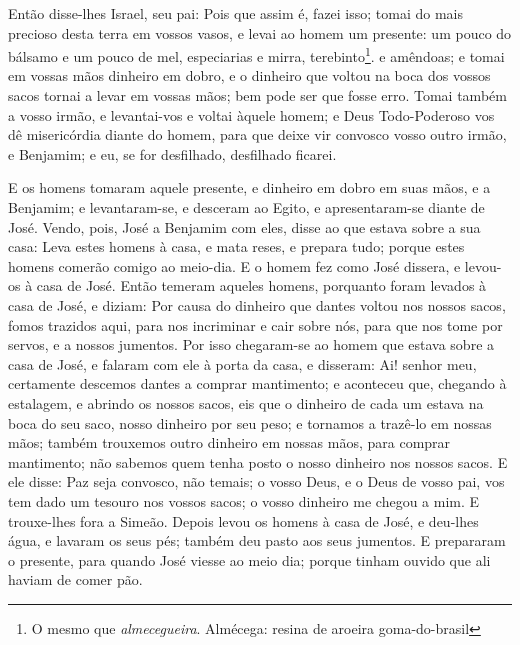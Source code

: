Então disse-lhes Israel, seu pai: Pois que assim é, fazei isso;
tomai do mais precioso desta terra em vossos vasos, e levai ao homem
um presente: um pouco do bálsamo e um pouco de mel, especiarias e
mirra, terebinto\footnote{O mesmo que \emph{almecegueira}. Almécega:
resina de aroeira goma-do-brasil}. e amêndoas; e tomai em
vossas mãos dinheiro em dobro, e o dinheiro que voltou na boca dos
vossos sacos tornai a levar em vossas mãos; bem pode ser que fosse
erro. Tomai também a vosso irmão, e levantai-vos e voltai
àquele homem; e Deus Todo-Poderoso vos dê misericórdia diante
do homem, para que deixe vir convosco vosso outro irmão, e Benjamim;
e eu, se for desfilhado, desfilhado ficarei.

E os homens tomaram aquele presente, e dinheiro em dobro em suas
mãos, e a Benjamim; e levantaram-se, e desceram ao Egito, e
apresentaram-se diante de José. Vendo, pois, José a Benjamim
com eles, disse ao que estava sobre a sua casa: Leva estes homens à
casa, e mata reses, e prepara tudo; porque estes homens comerão
comigo ao meio-dia. E o homem fez como José dissera, e
levou-os à casa de José. Então temeram aqueles homens,
porquanto foram levados à casa de José, e diziam: Por causa do
dinheiro que dantes voltou nos nossos sacos, fomos trazidos aqui,
para nos incriminar e cair sobre nós, para que nos tome por servos,
e a nossos jumentos. Por isso chegaram-se ao homem que estava
sobre a casa de José, e falaram com ele à porta da casa, e
disseram: Ai! senhor meu, certamente descemos dantes a comprar
mantimento; e aconteceu que, chegando à estalagem, e abrindo
os nossos sacos, eis que o dinheiro de cada um estava na boca do seu
saco, nosso dinheiro por seu peso; e tornamos a trazê-lo em nossas
mãos; também trouxemos outro dinheiro em nossas mãos, para
comprar mantimento; não sabemos quem tenha posto o nosso dinheiro
nos nossos sacos. E ele disse: Paz seja convosco, não temais;
o vosso Deus, e o Deus de vosso pai, vos tem dado um tesouro nos
vossos sacos; o vosso dinheiro me chegou a mim. E trouxe-lhes fora a
Simeão. Depois levou os homens à casa de José, e deu-lhes
água, e lavaram os seus pés; também deu pasto aos seus jumentos.
E prepararam o presente, para quando José viesse ao meio dia;
porque tinham ouvido que ali haviam de comer pão.


